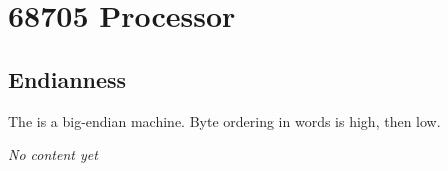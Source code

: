 \chapter{68705 Processor}
\label{processor:68705}

\section{Endianness}

The  is a big-endian machine. Byte ordering in words is high, then low.

\emph{No content yet}